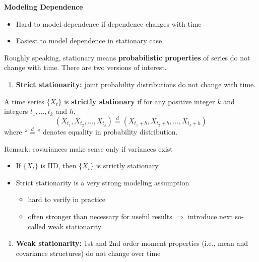 \documentclass[]{book}
\providecommand{\tightlist}{%
  \setlength{\itemsep}{0pt}\setlength{\parskip}{0pt}}
\begin{document}
\textbf{Modeling Dependence}

\begin{itemize}
\tightlist
\item
  Hard to model dependence if dependence changes with time
\item
  Easiest to model dependence in stationary case
\end{itemize}

Roughly speaking, stationary means \textbf{probabilistic properties} of
series do not change with time. There are two versions of interest.

\begin{enumerate}
\def\labelenumi{\arabic{enumi}.}
\tightlist
\item
  \textbf{Strict stationarity:} joint probability distributions do not
  change with time.
\end{enumerate}

A time series \(\{X_t\}\) is \textbf{strictly stationary} if for any
positive integer \(k\) and integers \(t_1, \ldots, t_k\) and \(h\), \[
 (X_{t_1},X_{t_2},\ldots,X_{t_k}) \overset{d}{=} (X_{t_1+h},X_{t_2+h},\ldots,X_{t_k+h})
 \] where ``\(\overset{d}{=}\)'' denotes equality in probability
distribution.

Remark: covariances make sense only if variances exist

\begin{itemize}
\tightlist
\item
  If \(\{X_t\}\) is IID, then \(\{X_t\}\) is strictly stationary
\item
  Strict stationarity is a very strong modeling assumption

  \begin{itemize}
  \tightlist
  \item
    hard to verify in practice
  \item
    often stronger than necessary for useful results \(\Rightarrow\)
    introduce next so-called weak stationarity
  \end{itemize}
\end{itemize}

\begin{enumerate}
\def\labelenumi{\arabic{enumi}.}
\setcounter{enumi}{1}
\tightlist
\item
  \textbf{Weak stationarity:} 1st and 2nd order moment properties (i.e.,
  mean and covariance structures) do not change over time
\end{enumerate}
\end{document}
